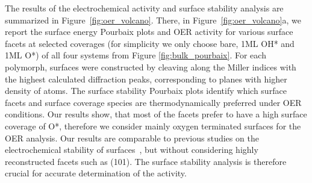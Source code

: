 %
%
The results of the electrochemical activity and surface stability analysis are summarized in Figure~\ref{fig:oer_volcano}.
%
There, in Figure~\ref{fig:oer_volcano}a, we report the surface energy Pourbaix plots and OER activity for various surface facets at selected coverages (for simplicity we only choose bare, 1ML OH* and 1ML O*) of all four systems from Figure \ref{fig:bulk_pourbaix}.
%
For each polymorph, surfaces were constructed by cleaving along the Miller indices with the highest calculated  diffraction peaks, corresponding to planes with higher density of atoms.
%
The surface stability Pourbaix plots identify which surface facets and surface coverage species are thermodynamically preferred under OER conditions.
%
Our results show, that most of the facets prefer to have a high surface coverage of O*, therefore we consider mainly oxygen terminated surfaces for the OER analysis.
%
Our results are comparable to previous studies on the electrochemical stability of \IrOtwo surfaces~\cite{Nattino2019,Raman2020},
but without considering highly reconstructed facets such as (101).
%
The surface stability analysis is therefore crucial for accurate determination of the activity.


